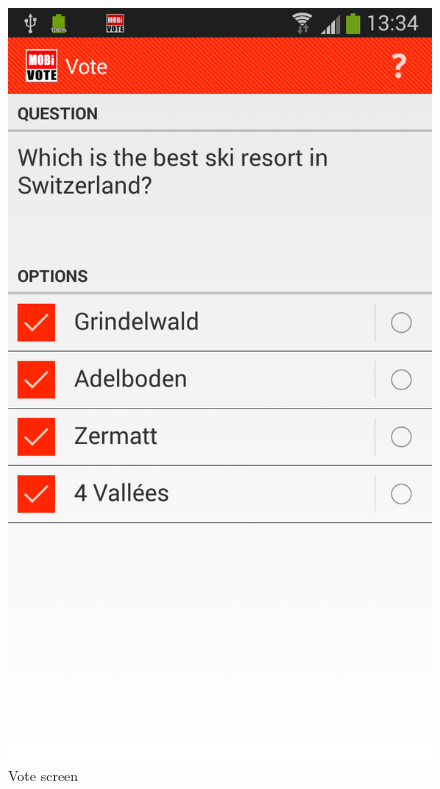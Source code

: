 \documentclass[numbers=noenddot, abstract=on, a4paper, headsepline,
footsepline, oneside, openright, draft=off, listof=leveldown]{scrreprt}
\begin{document}
\begin{figure}[!htb]
	\begin{minipage}{.5\textwidth}
  		\centering
		\includegraphics[height=.4\textheight]{img/screenshots/vote}
		\caption{Vote screen}
		\label{fig:handbook_votescreen}
	\end{minipage}
	\begin{minipage}{.5\textwidth}
  		\centering

\end{minipage}
\end{figure}
\end{document}
